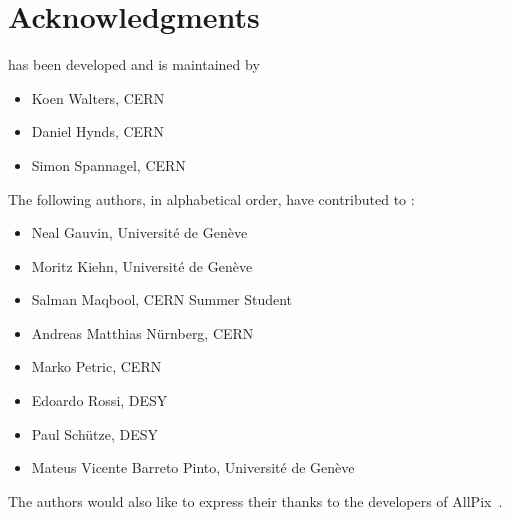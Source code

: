 \section{Acknowledgments}

\apsq has been developed and is maintained by

\begin{itemize}
\item Koen Walters, CERN
\item Daniel Hynds, CERN
\item Simon Spannagel, CERN
\end{itemize}

The following authors, in alphabetical order, have contributed to \apsq:

\begin{itemize}
\item Neal Gauvin, Université de Genève
\item  Moritz Kiehn, Université de Genève
\item  Salman Maqbool, CERN Summer Student
\item  Andreas Matthias Nürnberg, CERN
\item  Marko Petric, CERN
\item  Edoardo Rossi, DESY
\item  Paul Schütze, DESY
\item  Mateus Vicente Barreto Pinto, Université de Genève
\end{itemize}

The authors would also like to express their thanks to the developers of AllPix~\cite{ap1wiki,ap1git}.
